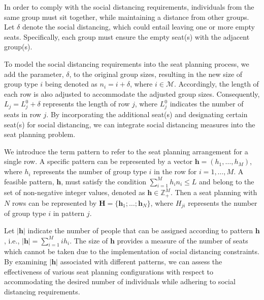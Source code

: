 In order to comply with the social distancing requirements, individuals from the same group must sit together, while maintaining a distance from other groups. Let $\delta$ denote the social distancing, which could entail leaving one or more empty seats. Specifically, each group must ensure the empty seat(s) with the adjacent group(s).

To model the social distancing requirements into the seat planning process, we add the parameter, $\delta$, to the original group sizes, resulting in the new size of group type $i$ being denoted as $n_i = i + \delta$, where $i \in \mathcal{M}$. Accordingly, the length of each row is also adjusted to accommodate the adjusted group sizes. Consequently, $L_j = L_j^{0} + \delta$ represents the length of row $j$, where $L_j^{0}$ indicates the number of seats in row $j$. By incorporating the additional seat(s) and designating certain seat(s) for social distancing, we can integrate social distancing measures into the seat planning problem.


We introduce the term pattern to refer to the seat planning arrangement for a single row. A specific pattern can be represented by a vector $\bm{h} = (h_1, \ldots, h_M)$, where $h_i$ represents the number of group type $i$ in the row for $i = 1,\ldots, M$. A feasible pattern, $\bm{h}$, must satisfy the condition $\sum_{i=1}^{M} h_i n_i \leq L$ and belong to the set of non-negative integer values, denoted as $\bm{h} \in \mathbb{Z}_{+}^{M}$. Then a seat planning with $N$ rows can be represented by $\bm{H} = \{\bm{h}_1; \ldots; \bm{h}_N\}$, where $H_{ji}$ represents the number of group type $i$ in pattern $j$.
  
Let $|\bm{h}|$ indicate the number of people that can be assigned according to pattern $\bm{h}$, i.e., $|\bm{h}| = \sum_{i =1}^{M} i h_i$. The size of $\bm{h}$ provides a measure of the number of seats which cannot be taken due to the implementation of social distancing constraints. By examining $|\bm{h}|$ associated with different patterns, we can assess the effectiveness of various seat planning configurations with respect to accommodating the desired number of individuals while adhering to social distancing requirements.


